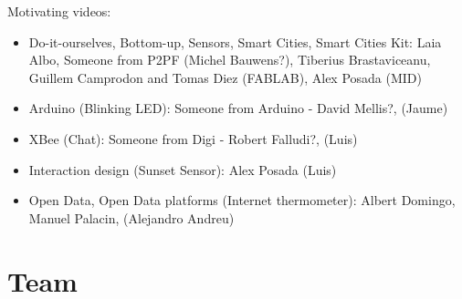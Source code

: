 \documentclass[oneside]{book}   %
\begin{document}
Motivating videos:
\begin{itemize}
\item Do-it-ourselves, Bottom-up, Sensors, Smart Cities, Smart Cities Kit:
Laia Albo, Someone from P2PF (Michel Bauwens?), Tiberius Brastaviceanu, Guillem Camprodon and Tomas Diez (FABLAB), Alex Posada (MID)

\item Arduino (Blinking LED):
Someone from Arduino - David Mellis?, (Jaume)

\item XBee (Chat):
Someone from Digi - Robert Falludi?, (Luis)

\item Interaction design (Sunset Sensor):
Alex Posada (Luis)

\item Open Data, Open Data platforms (Internet thermometer):
Albert Domingo, Manuel Palacin, (Alejandro Andreu)
\end{itemize}



\chapter{Team}
\end{document}
